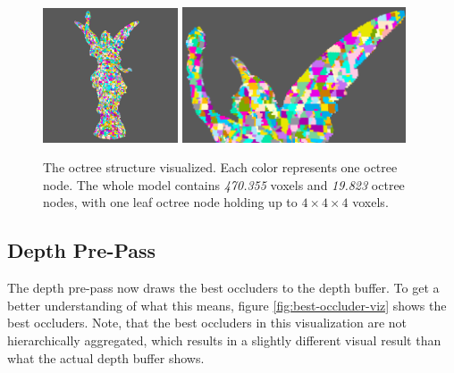 \begin{figure}[h]
    \centering
    \includegraphics[width=151.5px]{images/graphics/lucy-voxel-octree-viz.jpg}
    \includegraphics[width=250px]{images/graphics/lucy-voxel-octree-viz-2.jpg}
    \caption{The octree structure visualized. Each color represents one octree node. The whole model contains 
    \emph{470.355} voxels and \emph{19.823} octree nodes, with one leaf octree node holding up to \begin{math} 4 \times 4 \times 4 \end{math}
    voxels.}
    \label{fig:voxel-octree-viz}
\end{figure}

\subsection*{Depth Pre-Pass} \label{subsec-depth-pre-pass}

The depth pre-pass now draws the best occluders to the depth buffer. To get a better understanding of what this 
means, figure \ref{fig:best-occluder-viz} shows the best occluders. Note, that the best occluders in this 
visualization are not hierarchically aggregated, which results in a slightly different visual result than what 
the actual depth buffer shows. 


